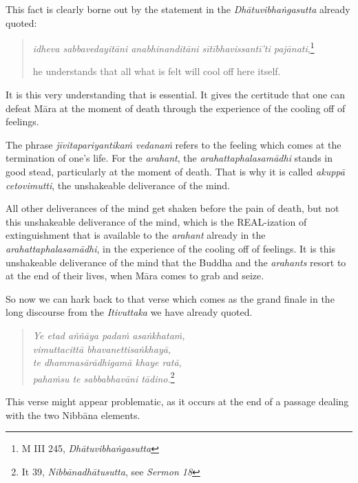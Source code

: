 This fact is clearly borne out by the statement in the \emph{Dhātuvibhaṅgasutta} already quoted:

\begin{quote}
\emph{idheva sabbavedayitāni anabhinanditāni sītībhavissantī'ti pajānati},\footnote{M III 245, \emph{Dhātuvibhaṅgasutta}}

he understands that all what is felt will cool off here itself.
\end{quote}

It is this very understanding that is essential. It gives the certitude that one can defeat Māra at the moment of death through the experience of the cooling off of feelings.

The phrase \emph{jīvitapariyantikaṁ vedanaṁ} refers to the feeling which comes at the termination of one's life. For the \emph{arahant}, the \emph{arahattaphalasamādhi} stands in good stead, particularly at the moment of death. That is why it is called \emph{akuppā cetovimutti}, the unshakeable deliverance of the mind.

All other deliverances of the mind get shaken before the pain of death, but not this unshakeable deliverance of the mind, which is the REAL-ization of extinguishment that is available to the \emph{arahant} already in the \emph{arahattaphalasamādhi}, in the experience of the cooling off of feelings. It is this unshakeable deliverance of the mind that the Buddha and the \emph{arahants} resort to at the end of their lives, when Māra comes to grab and seize.

So now we can hark back to that verse which comes as the grand finale in the long discourse from the \emph{Itivuttaka} we have already quoted.

\begin{quote}
\emph{Ye etad aññāya padaṁ asaṅkhataṁ,}\\
\emph{vimuttacittā bhavanettisaṅkhayā,}\\
\emph{te dhammasārādhigamā khaye ratā,}\\
\emph{pahaṁsu te sabbabhavāni tādino.}\footnote{It 39, \emph{Nibbānadhātusutta}, see \emph{Sermon 18}}
\end{quote}

This verse might appear problematic, as it occurs at the end of a passage dealing with the two Nibbāna elements.

